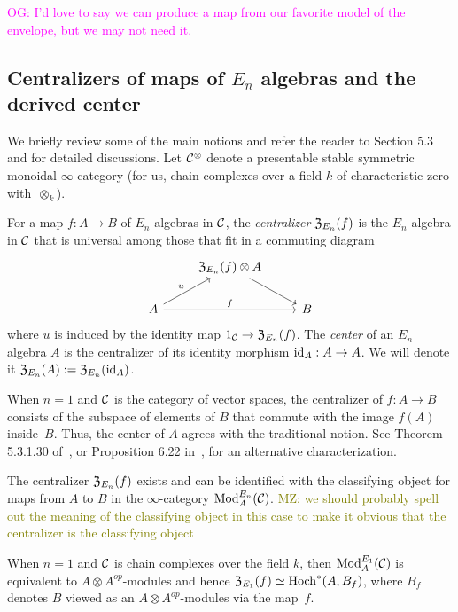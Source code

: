 \documentclass[11pt]{amsart}
\numberwithin{equation}{section}
\def\owen{\textcolor{magenta}{OG: }\textcolor{magenta}}
\def\mahmoud{\textcolor{olive}{MZ: }\textcolor{olive}}
\begin{document}
\owen{I'd love to say we can produce a map from our favorite model of the envelope, but we may not need it.}

\subsection{Centralizers of maps of $E_n$ algebras and the derived center}
\label{sec: centralizer}

We briefly review some of the main notions and refer the reader to \cite{LurieHA} Section 5.3 and \cite{FrancisHH} for detailed discussions. Let $\mathcal C^\otimes$ denote a presentable stable symmetric monoidal $\infty$-category (for us, chain complexes over a field $k$ of characteristic zero with~$\otimes_k$).

\begin{dfn}\label{D:centralizer}
For a map $f: A \to B$ of $E_n$ algebras in $\mathcal C$, 
the {\em centralizer} ${\frak Z}_{E_n}(f)$ is the $E_n$ algebra in $\mathcal C$ that is universal among those that fit in a commuting diagram
\[
\begin{tikzcd}
& {\frak Z}_{E_n}(f) \otimes A \arrow[dr] & \\
A \arrow[ur, "u"] \arrow[rr, "f"] && B
\end{tikzcd}
\]
where $u$ is induced by the identity map $1_\mathcal C \to {\frak Z}_{E_n}(f)$.
The {\em center} of an $E_n$ algebra $A$ is the centralizer of its identity morphism ${\rm id}_A: A \to A$. We will denote it ${\frak Z}_{E_n}(A) 
:= {\frak Z}_{E_n}({\rm id}_A)$.
\end{dfn}
When $n=1$ and $\mathcal C$ is the category of vector spaces, the centralizer of $f: A \to B$ consists of the subspace of elements of $B$ that commute with the image $f(A)$ inside~$B$. Thus, the center of $A$ agrees with the traditional notion. See Theorem 5.3.1.30 of~\cite{LurieHA}, or Proposition 6.22 in~\cite{GTZ3}, for an alternative characterization.

\begin{prp}\label{T:centralizer=inthom} 
The centralizer ${\frak Z}_{E_n}(f)$ exists and can be identified with the classifying object for maps from $A$ to $B$ in the $\infty$-category ${\rm Mod}^{E_n}_A(\mathcal C)$. \mahmoud{we should probably spell out the meaning of the classifying object in this case to make it obvious that the centralizer is the classifying object}
\end{prp} 

When $n=1$ and $\mathcal C$ is chain complexes over the field $k$, then ${\rm Mod}^{E_1}_A(\mathcal C)$ is equivalent to $A\otimes A^{op}$-modules and hence ${\frak Z}_{E_1}(f) \simeq {\rm Hoch}^*(A,B_f)$,
where $B_f$ denotes $B$ viewed as an $A\otimes A^{op}$-modules via the map~$f$.
\end{document}
